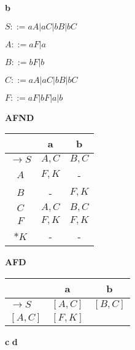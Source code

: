 \documentclass[ ]{article}
\begin{document}
		\newpage
		\textbf{b}
		
		$S ::= aA | aC | bB | bC$
		
		$A ::= aF | a$
		
		$B ::= bF | b$
		
		$C ::= aA | aC | bB | bC$
		
		$F ::= aF | bF | a | b$
		
		
\begin{center}
    \begin{minipage}[t]{0.48\textwidth} %
        \centering %
        \textbf{AFND}\\ %
        \vspace{0.2cm} %
        \begin{tabular}{|c|c|c|} %
            \toprule %
            & a & b \\
            \midrule %
            $\to S$ & $A,C$ & $B,C$\\
            $A$ & $F,K$ & - \\
            $B$ & - & $F,K$\\
            $C$ & $A,C$ & $B,C$\\
            $F$ & $F,K$ & $F,K$\\
            $*K$ & - & - \\
            \bottomrule %
        \end{tabular}
    \end{minipage}%
    \hfill %
    \begin{minipage}[t]{0.48\textwidth} %
        \centering %
        \textbf{AFD}\\ %
        \vspace{0.2cm} %
        \begin{tabular}{|l|c|c|} %
            \toprule %
            & a & b \\
            \midrule %
			$\to S$ & $[A,C]$ & $[B,C]$\\
			$[A,C]$ & $[F,K]$ & \\


            \bottomrule %
        \end{tabular}
    \end{minipage}
\end{center}
		\newpage
		\textbf{c}
		\textbf{d} %
		
\end{document}
